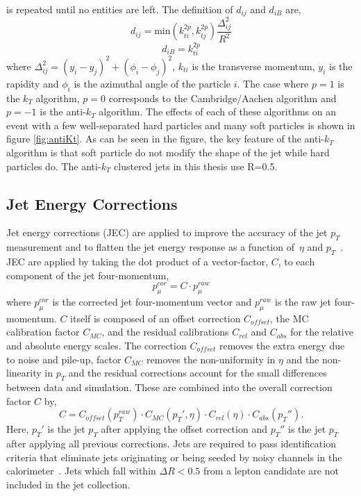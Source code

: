 is repeated until no entities are left. The definition of $d_{ij}$ and $d_{iB}$ are,
\begin{equation}
d_{ij}=\mathrm{min}(k_{ti}^{2p},k_{tj}^{2p})\frac{\Delta^{2}_{ij}}{R^{2}}
\end{equation}
\begin{equation}
d_{iB}=k_{ti}^{2p}
\end{equation}
where $\Delta_{ij}^{2}=(y_{i}-y_{j})^{2}+(\phi_{i}-\phi_{j})^{2}$, $k_{ti}$ is the 
transverse momentum, $y_{i}$ is the rapidity and $\phi_{i}$ is the azimuthal angle of 
the particle $i$. 
The case where $p=1$ is the $k_{T}$ algorithm, $p=0$ corresponds to the Cambridge/Aachen
algorithm and $p=-1$ is the anti-$k_{T}$ algorithm.
The effects of each of these algorithms on an event with a few well-separated hard particles
and many soft particles is shown in figure \ref{fig:antiKt}.
As can be seen in the figure, the key feature of the anti-$k_{T}$ algorithm is 
that soft particle do not modify the shape of the jet while hard particles do.
The anti-$k_{T}$ clustered jets in this thesis use R=0.5. 
%

\subsection{Jet Energy Corrections}
Jet energy corrections (JEC)
are applied to improve the accuracy of the jet $p_{T}$ measurement
and to flatten the jet energy response as a function
of~$\eta$ and $p_{T}$~\cite{jme-10-010}.
JEC are applied by taking the dot product of a vector-factor, $C$, to each component of the jet four-momentum,
\begin{equation}
p_{\mu}^{cor}=C\cdot p_{\mu}^{raw}
\end{equation}
where $p_{\mu}^{cor}$ is the corrected jet four-momentum vector and
$p_{\mu}^{raw}$ is the raw jet four-momentum\cite{ApplyJEC}.
$C$ itself is composed of an offset correction $C_{offset}$, the MC
calibration factor $C_{MC}$, and the residual calibrations $C_{rel}$ and $C_{abs}$
for the relative and absolute energy scales. The correction $C_{offset}$ 
removes the extra energy due to noise and pile-up, factor $C_{MC}$ removes
the non-uniformity in $\eta$ and the non-linearity in $p_{T}$ and the
residual corrections account for the small differences between data and simulation. These
are combined into the overall correction factor $C$ by,
\begin{equation}
C=C_{offset}(p_{T}^{raw})\cdot C_{MC}(p_{T}',\eta)\cdot C_{rel}(\eta)\cdot C_{abs}(p_{T}'').
\end{equation}
Here, $p_{T}'$ is the jet $p_{T}$ after applying the offset correction and  
$p_{T}''$ is the jet $p_{T}$ after applying all previous corrections.
Jets are required to pass identification
criteria that eliminate jets originating or being seeded by
noisy channels in the calorimeter~\cite{Chatrchyan:2009hy}.
Jets which fall within $\Delta R < 0.5$ from a lepton candidate
are not included in the jet collection.

